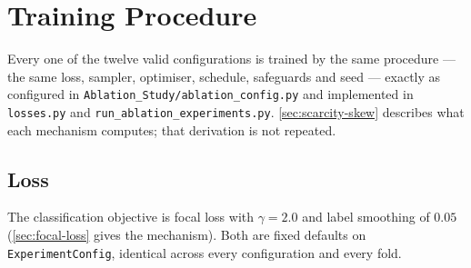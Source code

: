 %
%

\section{Training Procedure}
\label{sec:training-procedure}

Every one of the twelve valid configurations is trained by the same procedure --- the same loss, sampler, optimiser, schedule, safeguards and seed --- exactly as configured in \texttt{Ablation\_Study/ablation\_config.py} and implemented in \texttt{losses.py} and \texttt{run\_ablation\_experiments.py}. \autoref{sec:scarcity-skew} describes what each mechanism computes; that derivation is not repeated.

\subsection{Loss}
\label{sec:loss-config}

The classification objective is focal loss with $\gamma = 2.0$ and label smoothing of $0.05$ (\autoref{sec:focal-loss} gives the mechanism). Both are fixed defaults on \texttt{ExperimentConfig}, identical across every configuration and every fold.

